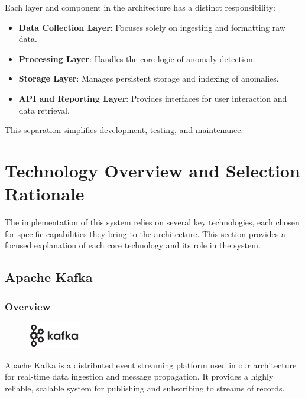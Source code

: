 Each layer and component in the architecture has a distinct responsibility:
\begin{itemize}
    \item \textbf{Data Collection Layer}: Focuses solely on ingesting and formatting raw data.
    \item \textbf{Processing Layer}: Handles the core logic of anomaly detection.
    \item \textbf{Storage Layer}: Manages persistent storage and indexing of anomalies.
    \item \textbf{API and Reporting Layer}: Provides interfaces for user interaction and data retrieval.
\end{itemize}
This separation simplifies development, testing, and maintenance.

\section{Technology Overview and Selection Rationale}

The implementation of this system relies on several key technologies, each chosen for specific capabilities they bring to the architecture. This section provides a focused explanation of each core technology and its role in the system.

\subsection{Apache Kafka}

\subsubsection{Overview}


\begin{figure}  %
    \vspace{-10pt} %
    \includegraphics[width=2.3cm]{figures/0_CuYxguE1vG7PLngW.png}
    \vspace{-10pt}
\end{figure}

Apache Kafka is a distributed event streaming platform used in our architecture for real-time data ingestion and message propagation. It provides a highly reliable, scalable system for publishing and subscribing to streams of records.



